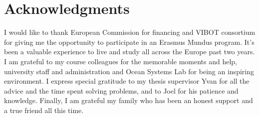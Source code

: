 \tableofcontents

\listoffigures
\listoftables

\chapter*{Acknowledgments}
         {\protect{}}

I would like to thank European Commission for financing and VIBOT consortium for giving me the opportunity to participate in an Erasmus Mundus program. It's been a valuable experience to live and study all across the Europe past two years. I am grateful to my course colleagues for the memorable moments and help, university staff and administration and Ocean Systems Lab for being an inspiring environment. I express special gratitude to my thesis supervisor Yvan for all the advice and the time spent solving problems, and to Joel for his patience and knowledge.  
Finally, I am grateful my family who has been an honest support and a true friend all this time.       
\pagestyle{fancy}
